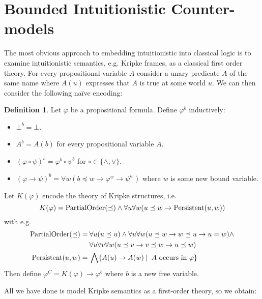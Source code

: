 \documentclass{easychair}
\theoremstyle{definition}
\theoremstyle{definition}
\theoremstyle{definition}
\theoremstyle{definition}
\theoremstyle{definition}
\newtheorem{definition}[theorem]{Definition}
\theoremstyle{definition}
\theoremstyle{definition}
\begin{document}
\section{Bounded Intuitionistic Counter-models}

The most obvious approach to embedding intuitionistic into classical logic is to examine intuitionistic semantics, e.g. Kripke frames, as a classical first order theory. For every propositional variable $A$ consider a unary predicate $A$ of the same name where $A(u)$ expresses that $A$ is true at some world $u$. We can then consider the following naïve encoding:

\begin{definition}
	Let $\varphi$ be a propositional formula.
 Define $\varphi^{b}$ inductively:
	\vspace*{-.1cm}
	\begin{itemize}
		\item $\bot^b = \bot$.
		\item $A^{b} = A(b)$ for every propositional variable $A$.
		\item $(\varphi\circ\psi)^b = \varphi^b\circ\psi^b$ for $\circ\in\{\wedge, \vee\}$.
		\item $(\varphi\to \psi)^b = \forall w(b\preceq w\to\varphi^{w}\to\psi^{w})$ where $w$ is some new bound variable.
	\end{itemize}
	Let $K(\varphi)$ encode the theory of Kripke structures, i.e.
	\vspace*{-.1cm}
	\[K(\varphi) = \text{\normalfont PartialOrder}(\preceq)\wedge\forall u\forall w(u\preceq w\to \text{\normalfont Persistent}(u, w))\]
	\vspace*{-.4cm}
	with e.g.
	\vspace*{-.2cm}
	\begin{align*}
		\text{\normalfont PartialOrder}(\preceq) =&\:\forall u(u\preceq u)\wedge\forall u\forall w(u\preceq w\to w\preceq u\to u = w)\wedge\\&\:\forall u\forall v\forall w(u\preceq v\to v\preceq w\to u\preceq w)\\
		\text{\normalfont Persistent}(u, w)=&\:\bigwedge \{A(u)\to A(w)\:|\: \text{ $A$ occurs in $\varphi$}\}
	\end{align*}
	Then define
	$\varphi^{C} = K(\varphi)\to \varphi^{b}$
	where $b$ is a new free variable.
\end{definition}

\noindent All we have done is model Kripke semantics as a first-order theory, so we obtain:
\end{document}
